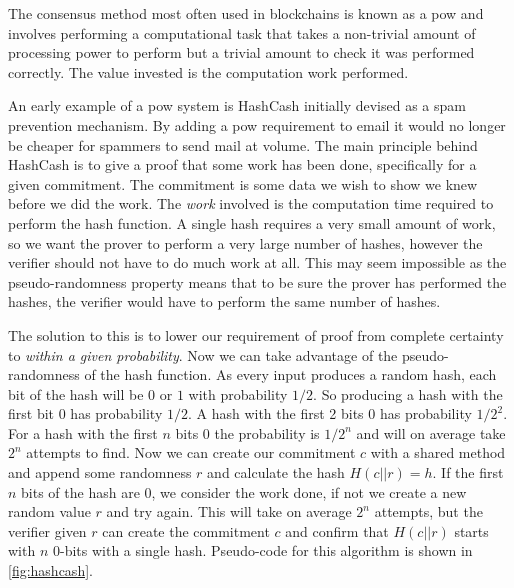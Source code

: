 The consensus method most often used in blockchains is known as a \gls{pow} and involves performing a computational task that takes a non-trivial amount of processing power to perform but a trivial amount to check it was performed correctly. The value invested is the computation work performed.

An early example of a \gls{pow} system is HashCash \cite{back_hashcash_2002} initially devised as a spam prevention mechanism. By adding a \gls{pow} requirement to email it would no longer be cheaper for spammers to send mail at volume. The main principle behind HashCash is to give a proof that some work has been done, specifically for a given commitment. The commitment is some data we wish to show we knew before we did the work. The \emph{work} involved is the computation time required to perform the hash function. A single hash requires a very small amount of work, so we want the prover to perform a very large number of hashes, however the verifier should not have to do much work at all. This may seem impossible as the pseudo-randomness property means that to be sure the prover has performed the hashes, the verifier would have to perform the same number of hashes.

The solution to this is to lower our requirement of proof from complete certainty to \emph{within a given probability}. Now we can take advantage of the pseudo-randomness of the hash function. As every input produces a random hash, each bit of the hash will be $0$ or $1$ with probability $1/2$. So producing a hash with the first bit $0$ has probability $1/2$. A hash with the first 2 bits $0$ has probability $1/2^2$. For a hash with the first $n$ bits $0$ the probability is $1/2^n$ and will on average take $2^n$ attempts to find. Now we can create our commitment $c$ with a shared method and append some randomness $r$ and calculate the hash $H(c || r) = h$. If the first $n$ bits of the hash are 0, we consider the work done, if not we create a new random value $r$ and try again. This will take on average $2^n$ attempts, but the verifier given $r$ can create the commitment $c$ and confirm that $H(c || r)$ starts with $n$ 0-bits with a single hash. Pseudo-code for this algorithm is shown in \autoref{fig:hashcash}.

